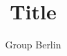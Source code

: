\documentclass[12pt, a4paper, twoside, table, xcdraw]{report}
\title{Title}
\author{Group Berlin}
\begin{document}


\tableofcontents




{\small


}
\end{document}
